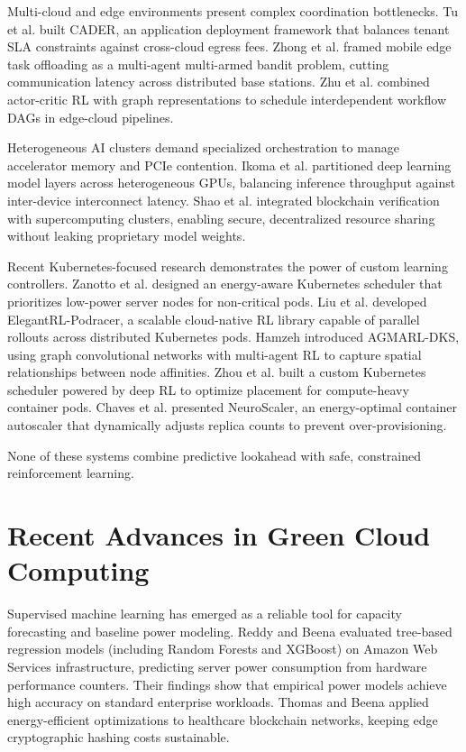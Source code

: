 \documentclass[12pt]{report}
\begin{document}
Multi-cloud and edge environments present complex coordination bottlenecks. Tu et al. \cite{tu2025} built CADER, an application deployment framework that balances tenant SLA constraints against cross-cloud egress fees. Zhong et al. \cite{zhong2025} framed mobile edge task offloading as a multi-agent multi-armed bandit problem, cutting communication latency across distributed base stations. Zhu et al. \cite{zhu2024} combined actor-critic RL with graph representations to schedule interdependent workflow DAGs in edge-cloud pipelines.

Heterogeneous AI clusters demand specialized orchestration to manage accelerator memory and PCIe contention. Ikoma et al. \cite{ikoma2025} partitioned deep learning model layers across heterogeneous GPUs, balancing inference throughput against inter-device interconnect latency. Shao et al. \cite{shao2025} integrated blockchain verification with supercomputing clusters, enabling secure, decentralized resource sharing without leaking proprietary model weights.

Recent Kubernetes-focused research demonstrates the power of custom learning controllers. Zanotto et al. \cite{zanotto2025} designed an energy-aware Kubernetes scheduler that prioritizes low-power server nodes for non-critical pods. Liu et al. \cite{liu2021} developed ElegantRL-Podracer, a scalable cloud-native RL library capable of parallel rollouts across distributed Kubernetes pods. Hamzeh \cite{hamzeh2026} introduced AGMARL-DKS, using graph convolutional networks with multi-agent RL to capture spatial relationships between node affinities. Zhou et al. \cite{zhou2026} built a custom Kubernetes scheduler powered by deep RL to optimize placement for compute-heavy container pods. Chaves et al. \cite{chaves2026} presented NeuroScaler, an energy-optimal container autoscaler that dynamically adjusts replica counts to prevent over-provisioning.

None of these systems combine predictive lookahead with safe, constrained reinforcement learning.

\section{Recent Advances in Green Cloud Computing}

Supervised machine learning has emerged as a reliable tool for capacity forecasting and baseline power modeling. Reddy and Beena \cite{reddy2024} evaluated tree-based regression models (including Random Forests and XGBoost) on Amazon Web Services infrastructure, predicting server power consumption from hardware performance counters. Their findings show that empirical power models achieve high accuracy on standard enterprise workloads. Thomas and Beena \cite{thomas2023} applied energy-efficient optimizations to healthcare blockchain networks, keeping edge cryptographic hashing costs sustainable.
\end{document}

